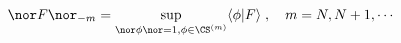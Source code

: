 \begin{equation}
\nor F\nor_{-m}=\sup_{\nor\phi\nor =1,\phi\in\CS^{(m)}}          
	\langle\phi|F\rangle\; ,       \quad m=N,N+1,\cdots
\end{equation} 
